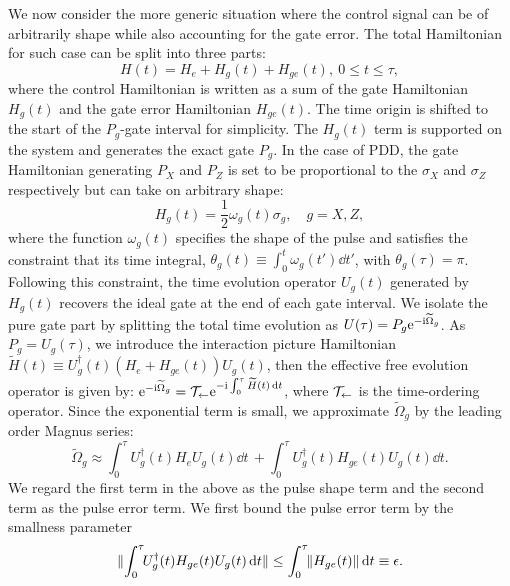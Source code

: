 \documentclass[pra,reprint,superscriptaddress]{revtex4-2}
\newcommand{\wt}[1]{\widetilde{#1}}
\begin{document}
We now consider the more generic situation where the control signal 
can be of arbitrarily shape while also accounting for the gate error. The total Hamiltonian for such case can be split into three parts:
\begin{equation}\label{eq:Hami-3parts}
 H(t)= H_e +H_g(t) + H_{ge}(t), \ 0\le t\le \tau,
\end{equation}
where the control Hamiltonian is
written as a sum of the gate Hamiltonian $H_g(t)$ and the gate error Hamiltonian $H_{ge}(t)$. The time origin is shifted to the start of the $P_g$-gate interval for simplicity. The $H_g(t)$  term is supported on the system and generates the exact gate $P_g$. 
In the case of PDD, the gate Hamiltonian generating $P_X$ and $P_Z$  is set to be proportional to the $\sigma_X$ and $\sigma_Z$ respectively but can take on arbitrary shape: 
\begin{equation}
 H_g(t) = \frac{1}{2}\omega_g(t)\sigma_g,\quad g=X,Z,
\end{equation}
where the function $\omega_g(t)$ specifies the shape of the pulse and satisfies the constraint that its time integral, $\theta_g(t)\equiv \int_0^t \omega_g(t') \dd t'$, with $\theta_g(\tau)=\pi$.
Following this constraint, the time evolution operator
$U_g(t)$ generated by $H_g(t)$
recovers the ideal gate at the end of each gate interval. We isolate the pure gate part by splitting the total time evolution as $U(\tau)=P_g \upe^{-\upi \wt \Omega_g}$. As $P_g=U_g(\tau)$, we introduce the interaction picture Hamiltonian 
$\wt H(t)\equiv U_g^\dagger(t) (H_e + H_{ge} (t)) U_g(t)$, then the effective free evolution operator is given by:
$\upe^{-\upi \wt \Omega_g} = \cT_{\leftarrow} \upe^{-\upi \int_0^\tau \wt H(t) \dd t}$,
where $\mathcal{T}_{\leftarrow}$ is the time-ordering operator. Since the exponential term is small, we approximate $\wt \Omega_g$ by the leading order Magnus series:
\begin{equation}
 \wt \Omega_g \approx\! \int_0^\tau\!\! U_g^\dagger(t) H_e U_g(t) \dd t\, + \! \int_0^\tau\!\! U_g^\dagger(t) H_{ge}(t) U_g(t) \dd t.
\end{equation} 
We regard the first term in the above as the pulse shape term and the second term as the pulse error term. 
We first bound the pulse error term by the smallness parameter
\begin{equation}
 \Vert {\int_0^\tau\!\! U_g^\dagger(t) H_{ge}(t) U_g(t) \mathop{}\!\mathrm{d}t} \Vert 
 \le  \int_0^\tau\!\! \Vert {H_{ge}(t)} \Vert \mathop{}\!\mathrm{d} t \equiv  \epsilon.
\end{equation}
\end{document}
